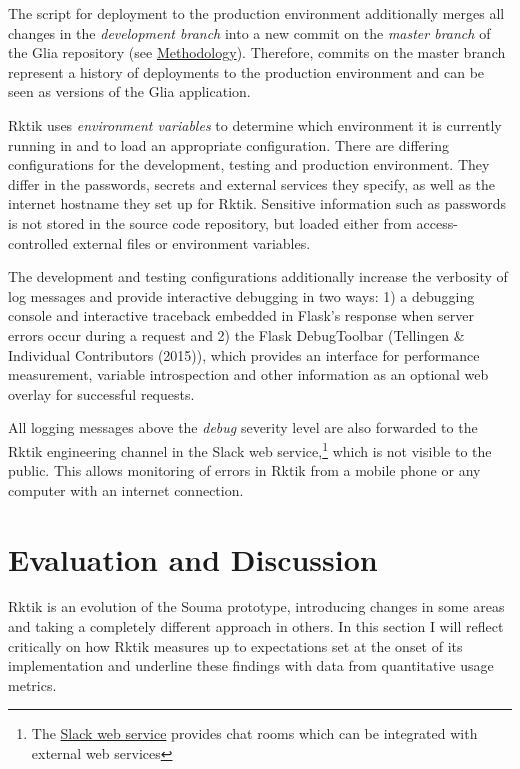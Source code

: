 The script for deployment to the production environment additionally
merges all changes in the \emph{development branch} into a new commit on
the \emph{master branch} of the Glia repository (see
\hyperref[methodology]{Methodology}). Therefore, commits on the master
branch represent a history of deployments to the production environment
and can be seen as versions of the Glia application.

Rktik uses \emph{environment variables} to determine which environment
it is currently running in and to load an appropriate configuration.
There are differing configurations for the development, testing and
production environment. They differ in the passwords, secrets and
external services they specify, as well as the internet hostname they
set up for Rktik. Sensitive information such as passwords is not stored
in the source code repository, but loaded either from access-controlled
external files or environment variables.

The development and testing configurations additionally increase the
verbosity of log messages and provide interactive debugging in two ways:
1) a debugging console and interactive traceback embedded in Flask's
response when server errors occur during a request and 2) the Flask
DebugToolbar (Tellingen \& Individual Contributors (2015)), which
provides an interface for performance measurement, variable
introspection and other information as an optional web overlay for
successful requests.

All logging messages above the \emph{debug} severity level are also
forwarded to the Rktik engineering channel in the Slack web
service,\footnote{The \href{https://slack.com}{Slack web service}
  provides chat rooms which can be integrated with external web services}
which is not visible to the public. This allows monitoring of errors in
Rktik from a mobile phone or any computer with an internet connection.

\chapter{Evaluation and Discussion}\label{evaluation-and-discussion}

Rktik is an evolution of the Souma prototype, introducing changes in
some areas and taking a completely different approach in others. In this
section I will reflect critically on how Rktik measures up to
expectations set at the onset of its implementation and underline these
findings with data from quantitative usage metrics.

